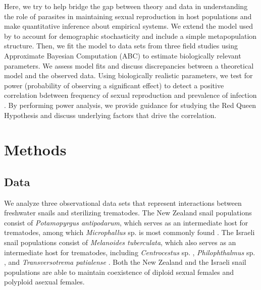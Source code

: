\documentclass{article}\usepackage[]{graphicx}\usepackage[]{color}
\begin{document}
Here, we try to help bridge the gap between theory and data in understanding the role of parasites in maintaining sexual reproduction in host populations and make quantitative inference about empirical systems.
We extend the model used by \cite{lively2010epidemiological} to account for demographic stochasticity and include a simple metapopulation structure.
Then, we fit the model to data sets from three field studies \citep{dagan2013clonal, mckone2016fine, vergara2014infection} using Approximate Bayesian Computation (ABC) to estimate biologically relevant parameters.
We assess model fits and discuss discrepancies between a theoretical model and the observed data.
Using biologically realistic parameters, we test for power (probability of observing a significant effect) to detect a positive correlation bdetween frequency of sexual reproduction and prevalence of infection \cite{lively2001trematode}.
By performing power analysis, we provide guidance for studying the Red Queen Hypothesis and discuss underlying factors that drive the correlation.

\section{Methods}

\subsection{Data}

We analyze three observational data sets \citep{vergara2014infection, mckone2016fine, dagan2013clonal} that represent interactions between freshwater snails and sterilizing trematodes.
The New Zealand snail populations \citep{vergara2014infection, mckone2016fine} consist of \textit{Potamopyrgus antipodarum}, which serves as an intermediate host for trematodes, 
among which \textit{Microphallus} sp. is most commonly found \citep{winterbourn1974larval, lively1987evidence}.
The Israeli snail populations \citep{dagan2013clonal} consist of \textit{Melanoides tuberculata}, which also serves as an intermediate host for trematodes, including \textit{Centrocestus} sp. \citep{ben2005spatial}, \textit{Philophthalmus} sp. \citep{ben2006first}, and \textit{Transversotrema patialense} \citep{ben2005differential}.
Both the New Zealand \citep{phillips1989genetics, wallace1992parthenogenesis, dybdahl1995diverse} and the Israeli \citep{samadi1999microsatellite} snail populations are able to maintain coexistence of diploid sexual females and polyploid asexual females.
\end{document}
